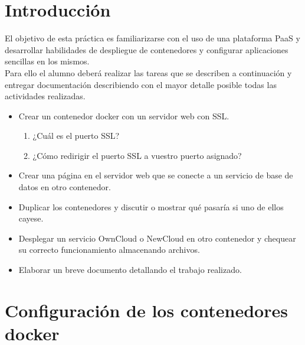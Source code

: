 	
\setcounter{page}{0}



\thispagestyle{empty}

\newpage %

\tableofcontents %


\newpage


\section{Introducción}

El objetivo de esta práctica es familiarizarse con el uso de una plataforma PaaS y desarrollar habilidades de despliegue de contenedores y configurar aplicaciones sencillas en los mismos. \\

Para ello el alumno deberá realizar las tareas que se describen a continuación y entregar documentación describiendo con el mayor detalle posible todas las actividades realizadas. \\

\begin{itemize}
	\item Crear un contenedor docker con un servidor web con SSL.
	\begin{enumerate}
		\item ¿Cuál es el puerto SSL?
		\item ¿Cómo redirigir el puerto SSL a vuestro puerto asignado?
	\end{enumerate}
	\item Crear una página en el servidor web que se conecte a un servicio de base de datos en otro contenedor.
	\item Duplicar los contenedores y discutir o mostrar qué pasaría si uno de ellos cayese.
	\item Desplegar un servicio OwnCloud o NewCloud en otro contenedor y chequear su correcto funcionamiento almacenando archivos.
	\item Elaborar un breve documento detallando el trabajo realizado.
\end{itemize}


\section{Configuración de los contenedores docker}

